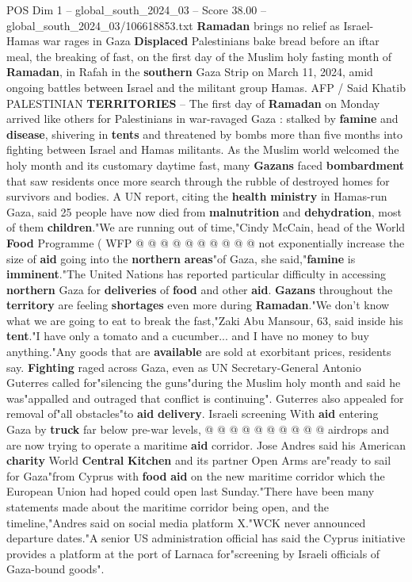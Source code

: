 \begin{textsample}{POS Dim 1 – global\_south\_2024\_03 – Score 38.00 – global\_south\_2024\_03/106618853.txt}  \label{ex:f1_pos_003}
\textbf{Ramadan} brings no relief as Israel-Hamas war rages in Gaza \textbf{Displaced} Palestinians bake bread before an iftar meal, the breaking of fast, on the first day of the Muslim holy fasting month of \textbf{Ramadan}, in Rafah in the \textbf{southern} Gaza Strip on March 11, 2024, amid ongoing battles between Israel and the militant group Hamas.
AFP / Said Khatib PALESTINIAN \textbf{TERRITORIES} -- The first day of \textbf{Ramadan} on Monday arrived like others for Palestinians in war-ravaged Gaza : stalked by \textbf{famine} and \textbf{disease}, shivering in \textbf{tents} and threatened by bombs more than five months into fighting between Israel and Hamas militants.
As the Muslim world welcomed the holy month and its customary daytime fast, many \textbf{Gazans} faced \textbf{bombardment} that saw residents once more search through the rubble of destroyed homes for survivors and bodies.
A UN report, citing the \textbf{health} \textbf{ministry} in Hamas-run Gaza, said 25 people have now died from \textbf{malnutrition} and \textbf{dehydration}, most of them \textbf{children}."We are running out of time,"Cindy McCain, head of the World \textbf{Food} Programme ( WFP @ @ @ @ @ @ @ @ @ @ not exponentially increase the size of \textbf{aid} going into the \textbf{northern} \textbf{areas}"of Gaza, she said,"\textbf{famine} is \textbf{imminent}."The United Nations has reported particular difficulty in accessing \textbf{northern} Gaza for \textbf{deliveries} of \textbf{food} and other \textbf{aid}. \textbf{Gazans} throughout the \textbf{territory} are feeling \textbf{shortages} even more during \textbf{Ramadan}."We don't know what we are going to eat to break the fast,"Zaki Abu Mansour, 63, said inside his \textbf{tent}."I have only a tomato and a cucumber... and I have no money to buy anything."Any goods that are \textbf{available} are sold at exorbitant prices, residents say. \textbf{Fighting} raged across Gaza, even as UN Secretary-General Antonio Guterres called for"silencing the guns"during the Muslim holy month and said he was"appalled and outraged that conflict is continuing".
Guterres also appealed for removal of"all obstacles"to \textbf{aid} \textbf{delivery}.
Israeli screening With \textbf{aid} entering Gaza by \textbf{truck} far below pre-war levels, @ @ @ @ @ @ @ @ @ @ airdrops and are now trying to operate a maritime \textbf{aid} corridor.
Jose Andres said his American \textbf{charity} World \textbf{Central} \textbf{Kitchen} and its partner Open Arms are"ready to sail for Gaza"from Cyprus with \textbf{food} \textbf{aid} on the new maritime corridor which the European Union had hoped could open last Sunday."There have been many statements made about the maritime corridor being open, and the timeline,"Andres said on social media platform X."WCK never announced departure dates."A senior US administration official has said the Cyprus initiative provides a platform at the port of Larnaca for"screening by Israeli officials of Gaza-bound goods".

\end{textsample}
